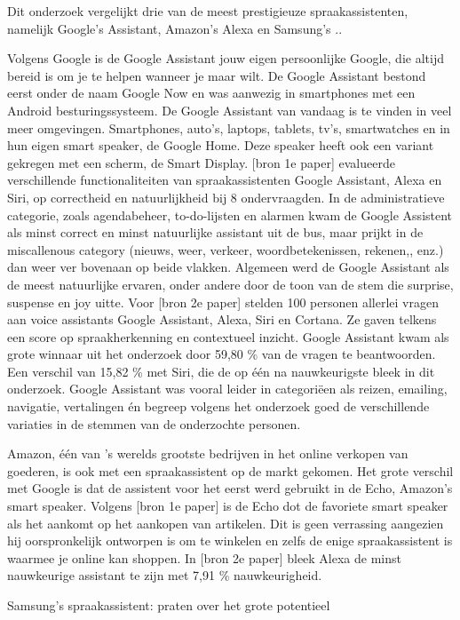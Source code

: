 Dit onderzoek vergelijkt drie van de meest prestigieuze spraakassistenten, namelijk Google’s Assistant, Amazon’s Alexa en Samsung's ..

Volgens Google is de Google Assistant jouw eigen persoonlijke Google, die altijd bereid is om je te helpen wanneer je maar wilt. De Google Assistant bestond eerst onder de naam Google Now en was aanwezig in smartphones met een Android besturingssysteem. De Google Assistant van vandaag is te vinden in veel meer omgevingen. Smartphones, auto's, laptops, tablets, tv's, smartwatches en in hun eigen smart speaker, de Google Home. Deze speaker heeft ook een variant gekregen met een scherm, de Smart Display.
[bron 1e paper] evalueerde verschillende functionaliteiten van spraakassistenten Google Assistant, Alexa en Siri, op correctheid en natuurlijkheid bij 8 ondervraagden. In de administratieve categorie, zoals agendabeheer, to-do-lijsten en alarmen kwam de Google Assistent als minst correct en minst natuurlijke assistant uit de bus, maar prijkt in de miscallenous category (nieuws, weer, verkeer, woordbetekenissen, rekenen,, enz.) dan weer ver bovenaan op beide vlakken. Algemeen werd de Google Assistant als de meest natuurlijke ervaren, onder andere door de toon van de stem die surprise, suspense en joy uitte.
Voor [bron 2e paper] stelden 100 personen allerlei vragen aan voice assistants Google Assistant, Alexa, Siri en Cortana. Ze gaven telkens een score op spraakherkenning en contextueel inzicht. Google Assistant kwam als grote winnaar uit het onderzoek door 59,80 \% van de vragen te beantwoorden. Een verschil van 15,82 \% met Siri, die de op één na nauwkeurigste bleek in dit onderzoek. Google Assistant was vooral leider in categoriëen als reizen, emailing, navigatie, vertalingen én begreep volgens het onderzoek goed de verschillende variaties in de stemmen van de onderzochte personen.

Amazon, één van 's werelds grootste bedrijven in het online verkopen van goederen, is ook met een spraakassistent op de markt gekomen. Het grote verschil met Google is dat de assistent voor het eerst werd gebruikt in de Echo, Amazon's smart speaker. Volgens [bron 1e paper] is de Echo dot de favoriete smart speaker als het aankomt op het aankopen van artikelen. Dit is geen verrassing aangezien hij oorspronkelijk ontworpen is om te winkelen en zelfs de enige spraakassistent is waarmee je online kan shoppen. In [bron 2e paper] bleek Alexa de minst nauwkeurige assistant te zijn met 7,91 \% nauwkeurigheid.

Samsung's spraakassistent: praten over het grote potentieel

